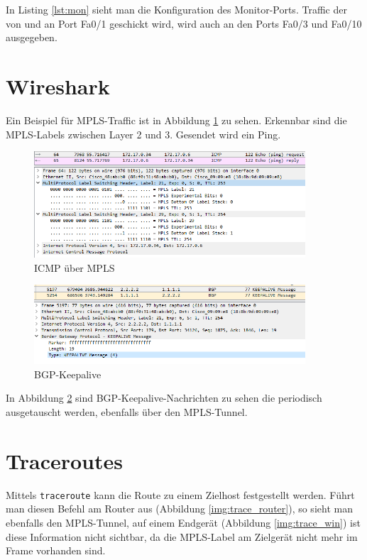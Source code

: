 In Listing \ref{lst:mon} sieht man die Konfiguration des Monitor-Ports. Traffic der von und an Port Fa0/1 geschickt wird, wird auch an den Ports Fa0/3 und Fa0/10 ausgegeben.

\section{Wireshark}

Ein Beispiel für \ac{MPLS}-Traffic ist in Abbildung \ref{img:icmp} zu sehen. Erkennbar sind die MPLS-Labels zwischen Layer 2 und 3. Gesendet wird ein Ping.

\begin{figure}[H]
	\centering
	\includegraphics[width=0.9\textwidth]{img/icmp_wireshark.png}
	\caption{ICMP über MPLS}
	\label{img:icmp}
\end{figure}

\begin{figure}[H]
	\centering
	\includegraphics[width=0.9\textwidth]{img/bgp_wireshark.png}
	\caption{BGP-Keepalive}
	\label{img:bgp}
\end{figure}

In Abbildung \ref{img:bgp} sind \ac{BGP}-Keepalive-Nachrichten zu sehen die periodisch ausgetauscht werden, ebenfalls über den \ac{MPLS}-Tunnel.

\section{Traceroutes}

Mittels \texttt{traceroute} kann die Route zu einem Zielhost festgestellt werden. Führt man diesen Befehl am Router aus (Abbildung \ref{img:trace_router}), so sieht man ebenfalls den \ac{MPLS}-Tunnel, auf einem Endgerät (Abbildung \ref{img:trace_win}) ist diese Information nicht sichtbar, da die MPLS-Label am Zielgerät nicht mehr im Frame vorhanden sind.

